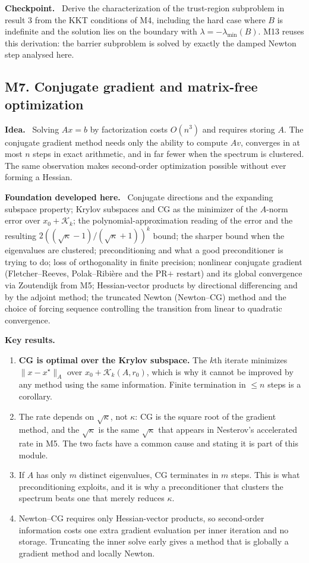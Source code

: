 \documentclass[11pt,a4paper]{article}
\newcommand{\mpart}[1]{\smallskip\noindent\textbf{#1}\ \ignorespaces}
\begin{document}
\mpart{Checkpoint.} Derive the characterization of the trust-region subproblem in result 3 from
the KKT conditions of M4, including the hard case where $B$ is indefinite and the solution lies
on the boundary with $\lambda = -\lambda_{\min}(B)$. M13 reuses this derivation: the barrier
subproblem is solved by exactly the damped Newton step analysed here.

\subsection{M7. Conjugate gradient and matrix-free optimization}

\mpart{Idea.} Solving $Ax=b$ by factorization costs $O(n^3)$ and requires storing $A$. The
conjugate gradient method needs only the ability to compute $Av$, converges in at most $n$
steps in exact arithmetic, and in far fewer when the spectrum is clustered. The same
observation makes second-order optimization possible without ever forming a Hessian.

\mpart{Foundation developed here.} Conjugate directions and the expanding subspace property;
Krylov subspaces and CG as the minimizer of the $A$-norm error over $x_0+\mathcal{K}_k$; the
polynomial-approximation reading of the error and the resulting
$2((\sqrt\kappa-1)/(\sqrt\kappa+1))^k$ bound; the sharper bound when the eigenvalues are
clustered; preconditioning and what a good preconditioner is trying to do; loss of
orthogonality in finite precision; nonlinear conjugate gradient (Fletcher--Reeves,
Polak--Ribi\`ere and the PR$+$ restart) and its global convergence via Zoutendijk from M5;
Hessian-vector products by directional differencing and by the adjoint method; the truncated
Newton (Newton--CG) method and the choice of forcing sequence controlling the transition from
linear to quadratic convergence.

\mpart{Key results.}
\begin{enumerate}
\item \textbf{CG is optimal over the Krylov subspace.} The $k$th iterate minimizes
$\|x-x^\star\|_A$ over $x_0+\mathcal{K}_k(A,r_0)$, which is why it cannot be improved by any
method using the same information. Finite termination in $\le n$ steps is a corollary.
\item The rate depends on $\sqrt\kappa$, not $\kappa$: CG is the square root of the gradient
method, and the $\sqrt\kappa$ is the same $\sqrt\kappa$ that appears in Nesterov's accelerated
rate in M5. The two facts have a common cause and stating it is part of this module.
\item If $A$ has only $m$ distinct eigenvalues, CG terminates in $m$ steps. This is what
preconditioning exploits, and it is why a preconditioner that clusters the spectrum beats one
that merely reduces $\kappa$.
\item Newton--CG requires only Hessian-vector products, so second-order information costs one
extra gradient evaluation per inner iteration and no storage. Truncating the inner solve
early gives a method that is globally a gradient method and locally Newton.
\end{enumerate}
\end{document}
